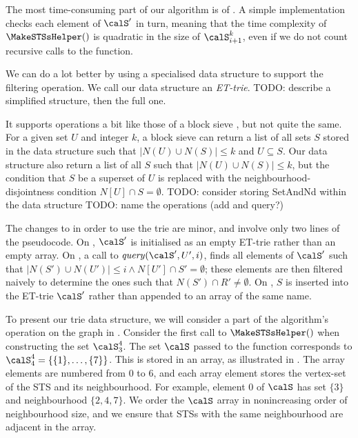The most time-consuming part of our algorithm is  of .
A simple implementation checks each element of $\calS'$ in turn, meaning that the time complexity
of $\MakeSTSsHelper()$ is quadratic in the size of $\calS_{i+1}^k$, even if we do
not count recursive calls to the function.

We can do a lot better by using a specialised data structure to support the filtering operation.
We call our data structure an \emph{ET-trie}.
TODO: describe a simplified structure, then the full one.

It supports operations a bit like those of a block sieve \cite{DBLP:journals/jco/Tamaki19},
but not quite the same.  For a given set $U$ and integer $k$, a block sieve can return a list of all sets $S$
stored in the data structure such that $|N(U) \cup N(S)| \leq k$ and $U \subseteq S$.
Our data structure also return a list of all $S$ such that $|N(U) \cup N(S)| \leq k$, but the
condition that $S$ be a superset of $U$ is replaced with the neighbourhood-disjointness 
condition $N[U] \cap S = \emptyset$.  TODO: consider storing SetAndNd within the data structure
TODO: name the operations (add and query?)

The changes to  in order to use the trie are
minor, and involve only two lines of the pseudocode.
On , $\calS'$ is initialised as an empty ET-trie rather than
an empty array.  On , a call to $\mathit{query}(\calS', U', i)$,
finds all elements of $\calS'$ such that $|N(S') \cup N(U')| \leq i \wedge N[U'] \cap S' = \emptyset$;
these elements are then filtered naively to determine the ones such that $N(S') \cap R' \not= \emptyset$.
On , $S$ is inserted into the ET-trie $\calS'$ rather than appended
to an array of the same name.

To present our trie data structure, we will consider a part of the algorithm's operation 
on the graph in .  Consider the first call
to $\MakeSTSsHelper()$ when constructing the set $\calS_3^4$.  The set $\calS$
passed to the function corresponds to $\calS_4^4 = \{\{1\}, \dots, \{7\}\}$.
This is stored in an array, as illustrated in .  The array
elements are numbered from 0 to 6, and each array element stores the vertex-set
of the STS and its neighbourhood.  For example, element 0 of $\calS$ has set
$\{3\}$ and neighbourhood $\{2, 4, 7\}$.  We order the $\calS$ array in nonincreasing
order of neighbourhood size, and we ensure that STSs with the same neighbourhood
are adjacent in the array.

